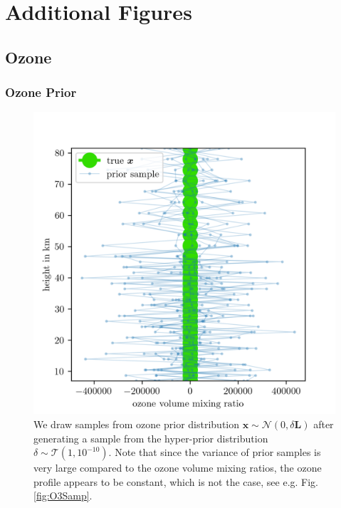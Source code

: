 
\chapter{Additional Figures}
\label{ap:addFig}
\section{Ozone}

\subsection{Ozone Prior}
\begin{figure}[ht!]
	\centering
	\includegraphics{OzonePrior.png}
	\caption[Samples from ozone prior distribution.]{We draw samples from ozone prior distribution $\bm{x} \sim \mathcal{N}(0,\delta \bm{L})$ after generating a sample from the hyper-prior distribution $\delta \sim \mathcal{T}(1,10^{-10})$. Note that since the variance of prior samples is very large compared to the ozone volume mixing ratios, the ozone profile appears to be constant, which is not the case, see e.g. Fig. \ref{fig:O3Samp}.}
	\label{fig:O3Prior}
\end{figure}


